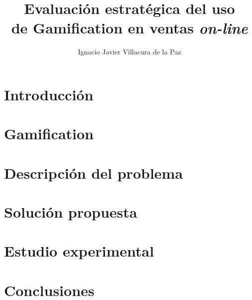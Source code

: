 \documentclass[11pt,letterpaper]{report}
\newcommand{\cmf}{\textcolor{red}{CMF:}\textcolor{blue}}
\begin{document}
\title{Evaluación estratégica del uso\\ de Gamification en ventas \emph{on-line}}
\author{Ignacio Javier Villacura de la Paz}
\ingciv
{}
\dedicate{
\cmf{Cambia esto al final nacho}
}

\nolistoffigures
\nolistoftables
\beforepreface
%
%
\afterpreface
\onehalfspacing

\chapter{Introducción}
\label{ch:introduccion}
    

\chapter{Gamification}
\label{ch:gamification}
    

\chapter{Descripción del problema}
\label{ch:desc}
    

\chapter{Solución propuesta}
\label{ch:solucion}
    

\chapter{Estudio experimental}
\label{ch:estudio}
    

\chapter{Conclusiones}
\label{ch:conclusiones}
    

\singlespacing


\end{document}
